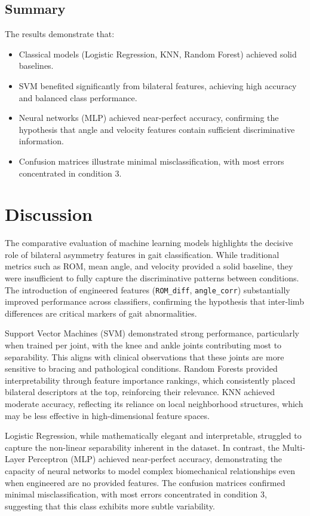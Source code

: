 \documentclass[journal]{IEEEtran}
\begin{document}
\subsection{Summary}
The results demonstrate that:
\begin{itemize}
    \item Classical models (Logistic Regression, KNN, Random Forest) achieved solid baselines.
    \item SVM benefited significantly from bilateral features, achieving high accuracy and balanced class performance.
    \item Neural networks (MLP) achieved near-perfect accuracy, confirming the hypothesis that angle and velocity features contain sufficient discriminative information.
    \item Confusion matrices illustrate minimal misclassification, with most errors concentrated in condition 3.
\end{itemize}

\section{Discussion}

The comparative evaluation of machine learning models highlights the decisive role of bilateral asymmetry features in gait classification. While traditional metrics such as ROM, 
mean angle, and velocity provided a solid baseline, they were insufficient to fully capture the discriminative patterns between conditions. The introduction of engineered 
features (\texttt{ROM\_diff}, \texttt{angle\_corr}) substantially improved performance across classifiers, confirming the hypothesis  that inter-limb differences are critical 
markers of gait abnormalities.

Support Vector Machines (SVM) demonstrated strong performance, particularly when trained per joint, with the knee and ankle joints contributing most to separability. 
This aligns with clinical observations that these joints are more sensitive to bracing and pathological conditions. Random Forests provided interpretability through feature 
importance rankings, which consistently placed bilateral descriptors at the top, reinforcing their relevance. KNN achieved moderate accuracy, reflecting its reliance on local 
neighborhood structures, which may be less effective in high-dimensional feature spaces.

Logistic Regression, while mathematically elegant and interpretable, struggled to capture the non-linear separability inherent in the dataset. In contrast, the Multi-Layer 
Perceptron (MLP) achieved near-perfect accuracy, demonstrating the capacity of neural networks to model complex biomechanical relationships even when engineered are no provided
features. The confusion matrices confirmed minimal misclassification, with most errors concentrated in condition 3, suggesting that this class exhibits more subtle variability.
\end{document}
